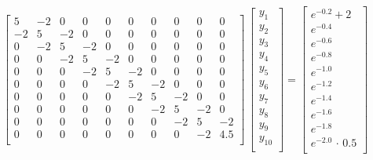 \[
 \left[
 \begin{array}{llllllllll}
  5 & -2 & 0 & 0 & 0 & 0 & 0 & 0 & 0 & 0 \\
  -2 & 5 & -2 & 0 & 0 & 0 & 0 & 0 & 0 & 0 \\
  0 & -2 & 5 & -2 & 0 & 0 & 0 & 0 & 0 & 0 \\
  0 & 0 & -2 & 5 & -2 & 0 & 0 & 0 & 0 & 0 \\
  0 & 0 & 0 & -2 & 5 & -2 & 0 & 0 & 0 & 0 \\
  0 & 0 & 0 & 0 & -2 & 5 & -2 & 0 & 0 & 0 \\
  0 & 0 & 0 & 0 & 0 & -2 & 5 & -2 & 0 & 0 \\
  0 & 0 & 0 & 0 & 0 & 0 & -2 & 5 & -2 & 0 \\
  0 & 0 & 0 & 0 & 0 & 0 & 0 & -2 & 5 & -2 \\
  0 & 0 & 0 & 0 & 0 & 0 & 0 & 0 & -2 & 4.5 \\
 \end{array}
 \right]
 \,
 \left[
 \begin{array}{l}
  y_1 \\
  y_2 \\
  y_3 \\
  y_4 \\
  y_5 \\
  y_6 \\
  y_7 \\
  y_8 \\
  y_9 \\
  y_{10} \\
 \end{array}
 \right]
 =
 \left[
 \begin{array}{l}
  e^{-0.2} + 2 \\
  e^{-0.4} \\
  e^{-0.6} \\
  e^{-0.8} \\
  e^{-1.0} \\
  e^{-1.2} \\
  e^{-1.4} \\
  e^{-1.6} \\
  e^{-1.8} \\
  e^{-2.0} \, \cdot \, 0.5 \\
 \end{array}
 \right]
\]

